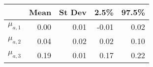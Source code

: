 \begin{tabular}{rrrrr} 
 \hline \hline 
& Mean & St Dev & \hspace{5pt} 2.5\% & 97.5\% \\ 
 \hline 
 $\mu_{a,1}$ & 0.00 & 0.01 & -0.01 & 0.02 \\ 
  $\mu_{a,2}$ & 0.04 & 0.02 & 0.02 & 0.10 \\ 
  $\mu_{a,3}$ & 0.19 & 0.01 & 0.17 & 0.22 \\ 
  [0.5em] 
 \hline 
\end{tabular} 
